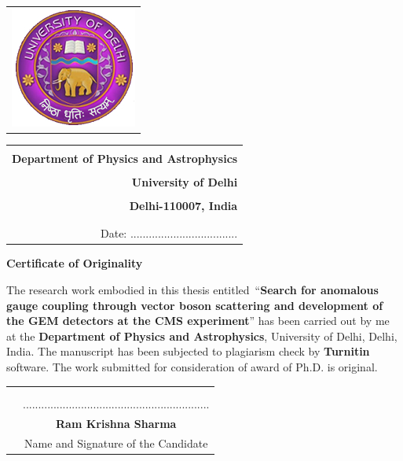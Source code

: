 \vspace{-1.5cm}

\begin{tabular}{l}
\includegraphics[scale=0.7]{figures/logo_du.jpg}
\end{tabular}
%
\hspace{3cm}
\begin{tabular}{r}
 \\
 \\
\color{blue} \textbf{Department of Physics  and Astrophysics} \\
 \\
\textbf{University of Delhi} \\
 \\
\textbf{Delhi-110007, India} \\
 \\
 \\
Date: ...................................  
\end{tabular}
%
\vspace{1cm}
\begin{center}
\textbf{\LARGE Certificate of Originality}
\end{center}
\vspace{0.5cm}
%
The research work embodied in this thesis entitled~``\textbf{Search for anomalous gauge coupling through vector boson scattering and development of the GEM detectors at the CMS experiment}'' has been carried out by me at the \textbf{Department of Physics and Astrophysics}, University of Delhi, Delhi, India. The manuscript has been subjected to plagiarism check by \textbf{Turnitin} software. The work submitted for consideration of award of Ph.D. is original. \\
\begin{tabular}{cc}
 & \\
 & \\
 & \hspace{9cm} ............................................................. \\
 & \hspace{9cm} \textbf{Ram Krishna Sharma} \\
 & \hspace{8.5cm} Name and Signature of the Candidate
\end{tabular}
